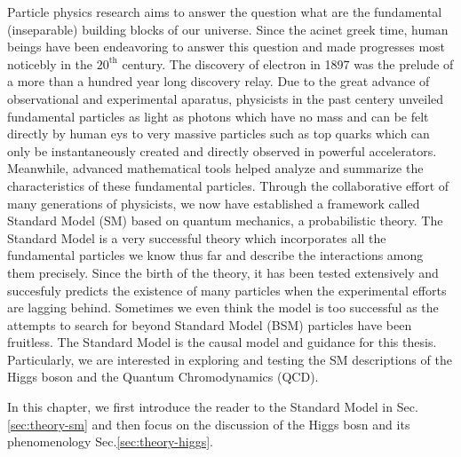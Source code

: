 Particle physics research aims to answer the question what are the fundamental (inseparable) building blocks of our universe. Since the acinet greek time, human beings have been endeavoring to answer this question and made progresses most noticebly in the $20^{\text{th}}$ century. The discovery of electron in 1897 was the prelude of a more than a hundred year long discovery relay. Due to the great advance of observational and experimental aparatus, physicists in the past centery unveiled fundamental particles as light as photons which have no mass and can be felt directly by human eys to very massive particles such as top quarks which can only be instantaneously created and directly observed in powerful accelerators. Meanwhile, advanced mathematical tools helped analyze and summarize the characteristics of these fundamental particles. Through the collaborative effort of many generations of physicists, we now have established a framework called Standard Model (SM) based on quantum mechanics, a probabilistic theory. The Standard Model is a very successful theory which incorporates all the fundamental particles we know thus far and describe the interactions among them precisely. Since the birth of the theory, it has been tested extensively and succesfuly predicts the existence of many particles when the experimental efforts are lagging behind. Sometimes we even think the model is too successful as the attempts to search for beyond Standard Model (BSM) particles have been fruitless. The Standard Model is the causal model and guidance for this thesis. Particularly, we are interested in exploring and testing the SM descriptions of the Higgs boson and the Quantum Chromodynamics (QCD).

In this chapter, we first introduce the reader to the Standard Model in Sec.\ref{sec:theory-sm} and then focus on the discussion of the Higgs bosn and its phenomenology Sec.\ref{sec:theory-higgs}.
